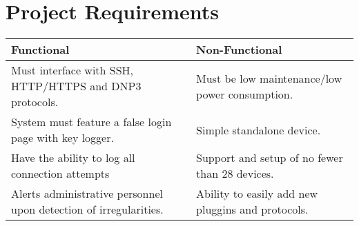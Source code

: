 \section*{\color{NavyBlue}Project Requirements}

\begin{center}
\setlength{\tabcolsep}{18pt}
\renewcommand{\arraystretch}{1.4}
\begin{tabularx}{\linewidth}{X X}
\textbf{Functional} & \textbf{Non-Functional} \\
\midrule
Must interface with SSH, HTTP/HTTPS and DNP3 protocols. & Must be low maintenance/low power consumption. \\
System must feature a false login page with key logger. & Simple standalone device. \\
Have the ability to log all connection attempts & Support and setup of no fewer than 28 devices. \\
Alerts administrative personnel upon detection of irregularities. & Ability to easily add new pluggins and protocols. \\
\end{tabularx}
\end{center}
